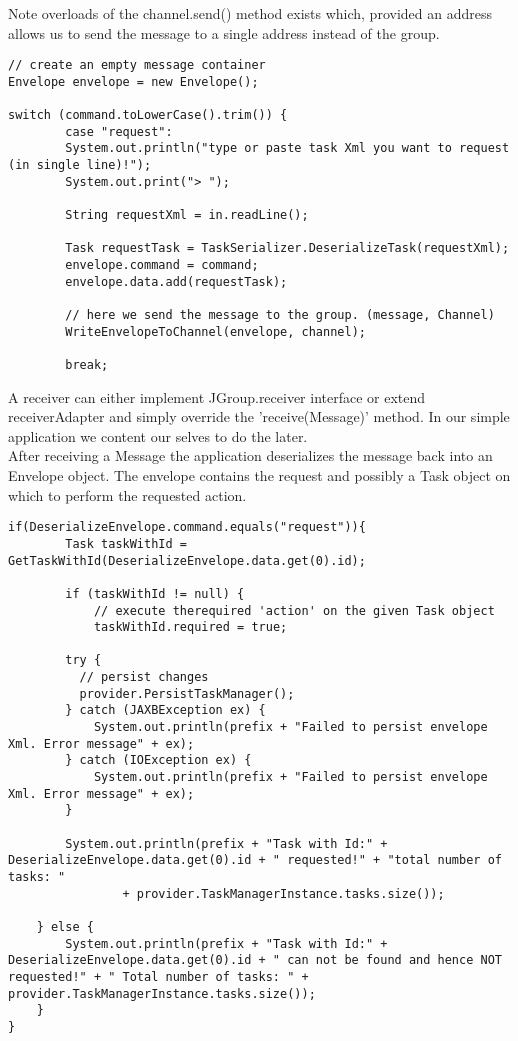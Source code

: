 Note overloads of the channel.send() method exists which, provided an address allows us to send the message to a single address instead of the group.

\pagebreak
\begin{lstlisting}[caption=eventloop]
// create an empty message container
Envelope envelope = new Envelope();

switch (command.toLowerCase().trim()) {
        case "request":
        System.out.println("type or paste task Xml you want to request (in single line)!");
        System.out.print("> ");
            		
        String requestXml = in.readLine();

        Task requestTask = TaskSerializer.DeserializeTask(requestXml);
        envelope.command = command;
        envelope.data.add(requestTask);

        // here we send the message to the group. (message, Channel)
        WriteEnvelopeToChannel(envelope, channel);
            		
   	   	break;

\end{lstlisting}

A receiver can either implement JGroup.receiver interface or extend receiverAdapter and simply override the 'receive(Message)' method. In our simple application we content our selves to do the later. \\

After receiving a Message the application deserializes the message back into an Envelope object.
The envelope contains the request and possibly a Task object on which to perform the requested action.

\begin{lstlisting}[caption=receiver]
if(DeserializeEnvelope.command.equals("request")){
	    Task taskWithId = GetTaskWithId(DeserializeEnvelope.data.get(0).id);
		
	    if (taskWithId != null) {
		    // execute therequired 'action' on the given Task object
	      	taskWithId.required = true;
		
	    try {
		  // persist changes
		  provider.PersistTaskManager();
	    } catch (JAXBException ex) {
	        System.out.println(prefix + "Failed to persist envelope Xml. Error message" + ex);
	    } catch (IOException ex) {
	        System.out.println(prefix + "Failed to persist envelope Xml. Error message" + ex);
	    }
		
	    System.out.println(prefix + "Task with Id:" + DeserializeEnvelope.data.get(0).id + " requested!" + "total number of tasks: "
	            + provider.TaskManagerInstance.tasks.size());
		
	} else {
	    System.out.println(prefix + "Task with Id:" + DeserializeEnvelope.data.get(0).id + " can not be found and hence NOT requested!" + " Total number of tasks: " + provider.TaskManagerInstance.tasks.size());
	}
}
\end{lstlisting}





